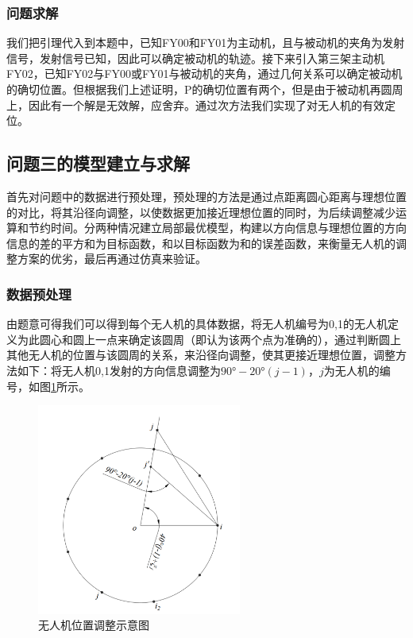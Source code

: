 \documentclass[withoutpreface,bwprint]{cumcmthesis} %
\begin{document}
\subsubsection{问题求解}
我们把引理代入到本题中，已知FY00和FY01为主动机，且与被动机的夹角为发射信号，发射信号已知，因此可以确定被动机的轨迹。接下来引入第三架主动机FY02，已知FY02与FY00或FY01与被动机的夹角，通过几何关系可以确定被动机的确切位置。但根据我们上述证明，P的确切位置有两个，但是由于被动机再圆周上，因此有一个解是无效解，应舍弃。通过次方法我们实现了对无人机的有效定位。



\subsection{问题三的模型建立与求解}
首先对问题中的数据进行预处理，预处理的方法是通过点距离圆心距离与理想位置的对比，将其沿径向调整，以使数据更加接近理想位置的同时，为后续调整减少运算和节约时间。分两种情况建立局部最优模型，构建以方向信息与理想位置的方向信息的差的平方和为目标函数，和以目标函数为和的误差函数，来衡量无人机的调整方案的优劣，最后再通过仿真来验证。

\subsubsection{数据预处理}
由题意可得我们可以得到每个无人机的具体数据，将无人机编号为0,1的无人机定义为此圆心和圆上一点来确定该圆周（即认为该两个点为准确的），通过判断圆上其他无人机的位置与该圆周的关系，来沿径向调整，使其更接近理想位置，调整方法如下：将无人机0,1发射的方向信息调整为$90°-20°(j-1)$，$j$为无人机的编号，如图\ref{q3_1}所示。

\begin{figure}[H]
    \centering
    \includegraphics[width=0.6\textwidth]{../../figure/q3_1.png} 
    \caption{无人机位置调整示意图}
    \label{q3_1}    
\end{figure}
\end{document}
